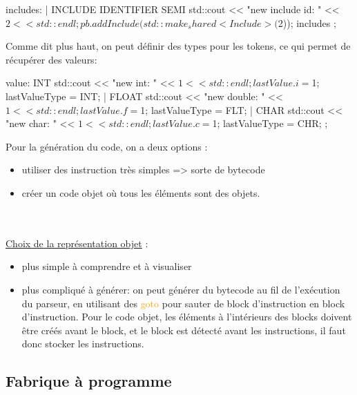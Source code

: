\documentclass[a4paper]{article}%
\begin{document}
\begin{code}[language=c++]
includes: %
       |
       INCLUDE IDENTIFIER SEMI
       {
         std::cout << "new include id: " << $2 << std::endl;
         pb.addInclude(std::make_shared<Include>($2));
       }
       includes
       ;
\end{code}\leavevmode\newline


Comme dit plus haut, on peut définir des types pour les tokens, ce qui permet de
récupérer des valeurs:

\begin{code}[language=c++]
value: INT {
       std::cout << "new int: " << $1 << std::endl;
       lastValue.i = $1;
       lastValueType = INT;
     } | FLOAT {
       std::cout << "new double: " << $1 << std::endl;
       lastValue.f = $1;
       lastValueType = FLT;
     } | CHAR {
       std::cout << "new char: " << $1 << std::endl;
       lastValue.c = $1;
       lastValueType = CHR;
     }
     ;
\end{code}\leavevmode\newline

Pour la génération du code, on a deux options :
\begin{itemize}
\item utiliser des instruction très simples => sorte de bytecode
\item créer un code objet où tous les éléments sont des objets.
\end{itemize}\leavevmode\\~\\

\underline{Choix de la représentation objet} :
\begin{itemize}
\item plus simple à comprendre et à visualiser
\item plus compliqué à générer: on peut générer du bytecode au fil de l'exécution du parseur, en utilisant des \textcolor{orange}{goto} pour sauter de block d'instruction en block d'instruction. Pour le code objet, les éléments à l'intérieurs des blocks doivent être créés avant le block, et le block est détecté avant les instructions, il faut donc stocker les instructions.
\end{itemize}


\clearpage{}
\subsection{Fabrique à programme}
\end{document}
